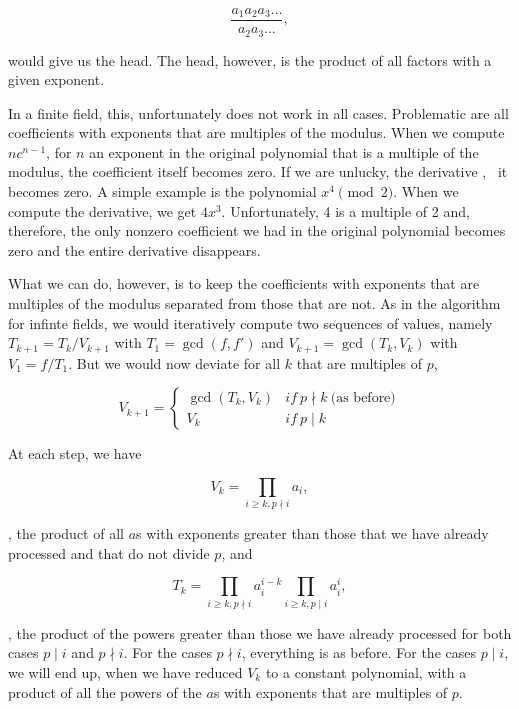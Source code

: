 \documentclass[tikz]{scrreprt}
\begin{document}
\[
\frac{a_1a_2a_3\dots}{a_2a_3\dots},
\]

would give us the head. The head, however,
is the product of all factors with a given exponent.

In a finite field, this, unfortunately does not
work in all cases. Problematic are all coefficients
with exponents that are multiples of the modulus.
When we compute $nc^{n-1}$, for $n$ an exponent
in the original polynomial that is a multiple of
the modulus, the coefficient itself becomes zero.
If we are unlucky, the derivative ,
\ie\ it becomes zero. A simple example is the polynomial
$x^4 \pmod{2}$. When we compute the derivative, we get
$4x^3$. Unfortunately, 4 is a multiple of 2 and,
therefore, the only nonzero coefficient we had
in the original polynomial becomes zero and the entire
derivative disappears.

What we can do, however, is to keep the coefficients
with exponents that are multiples of the modulus
separated from those that are not.
As in the algorithm for infinte fields, we would
iteratively compute two sequences of values,
namely $T_{k+1} = T_k/V_{k+1}$ with $T_1 = \gcd(f,f')$
and $V_{k+1} = \gcd(T_k,V_k)$ with $V_1 = f/T_1$.
But we would now deviate for all $k$ that are
multiples of $p$, \viz\: 

\[
V_{k+1} = \begin{cases}
            \gcd(T_k,V_k) & if~p\nmid k~\textrm{(as before)}\\
            V_k & if~p\mid k
          \end{cases}
\]

At each step, we have

\begin{equation}
V_k = \prod_{i\ge k, p\nmid i}{a_i},
\end{equation}

\ie, the product of all $a$s with exponents greater than those
that we have already processed and that do not divide $p$, and

\begin{equation}
T_k = \prod_{i\ge k, p\nmid i}{a_i^{i-k}}
      \prod_{i\ge k, p\mid i}{a_i^i},
\end{equation}

\ie, the product of the powers greater than those 
we have already processed for both cases $p\mid i$ and $p\nmid i$.
For the cases $p\nmid i$, everything is as before.
For the cases $p\mid i$, we will end up, when we have reduced
$V_k$ to a constant polynomial, with a product of all the powers
of the $a$s with exponents that are multiples of $p$.
\end{document}
